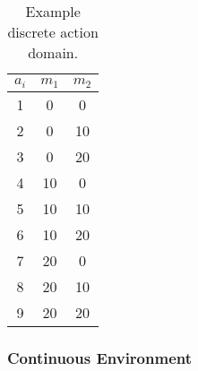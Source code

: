 \begin{table}
\begin{center}
\begin{tabular}{c|c|c}
\hline
$a_i$ &$m_1$ &$m_2$ \\
\hline\hline
 1 &0 &0 \\
 2 &0 &10 \\
 3 &0 &20 \\
 4 &10 &0 \\
 5 &10 &10 \\
 6 &10 &20 \\
 7 &20 &0 \\
 8 &20 &10 \\
 9 &20 &20 \\
\hline
\end{tabular}
\caption{Example discrete action domain.}
\label{tbl:example_actions}
\end{center}
\end{table}

\subsubsection{Continuous Environment}

